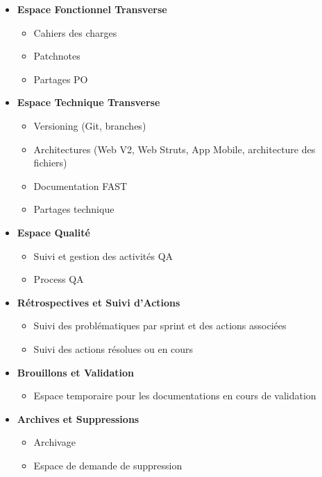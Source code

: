 \documentclass{article}
\begin{document}
\begin{itemize}
    \item \textbf{Espace Fonctionnel Transverse}
    \begin{itemize}
        \item Cahiers des charges
        \item Patchnotes
        \item Partages PO
    \end{itemize}
    
    \item \textbf{Espace Technique Transverse}
    \begin{itemize}
        \item Versioning (Git, branches)
        \item Architectures (Web V2, Web Struts, App Mobile, architecture des fichiers)       
        \item Documentation FAST
        \item Partages technique
    \end{itemize}
    
    \item \textbf{Espace Qualité}
    \begin{itemize}
        \item Suivi et gestion des activités QA
        \item Process QA
    \end{itemize}
    
    \item \textbf{Rétrospectives et Suivi d'Actions}
    \begin{itemize}
        \item Suivi des problématiques par sprint et des actions associées
        \item Suivi des actions résolues ou en cours
    \end{itemize}
    
    \item \textbf{Brouillons et Validation}
    \begin{itemize}
        \item Espace temporaire pour les documentations en cours de validation
    \end{itemize}
    
    \item \textbf{Archives et Suppressions}
    \begin{itemize}
        \item Archivage
        \item Espace de demande de suppression
    \end{itemize}
\end{itemize}
\end{document}
